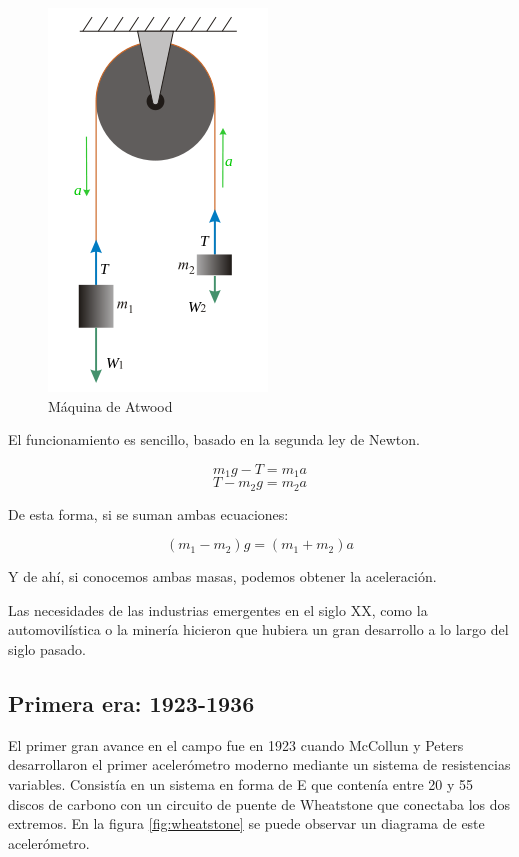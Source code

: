 \documentclass[12pt]{book}
\numberwithin{equation}{section}
\begin{document}
\begin{figure}[h]
    \centering
    \includegraphics[scale=0.5]{atwood.png}
    \caption{Máquina de Atwood}
    \label{fig:atwood}
\end{figure}

El funcionamiento es sencillo, basado en la segunda ley de Newton.

\begin{equation}
m_1 g -T = m_1 a
\end{equation}
\begin{equation}
T - m_2 g = m_2 a
\end{equation}

De esta forma, si se suman ambas ecuaciones:

\begin{equation}
(m_1 -m_2)g = (m_1+m_2)a
\end{equation}

Y de ahí, si conocemos ambas masas, podemos obtener la aceleración.

Las necesidades de las industrias emergentes en el siglo XX, como la automovilística o la minería hicieron que hubiera un gran desarrollo a lo largo del siglo pasado.

\subsection{Primera era: 1923-1936}

El primer gran avance en el campo fue en 1923 cuando McCollun y Peters\cite{6534032} desarrollaron el primer acelerómetro moderno mediante un sistema de resistencias variables. Consistía en un sistema en forma de E que contenía entre 20 y 55 discos de carbono con un circuito de puente de Wheatstone que conectaba los dos extremos. En la figura \ref{fig:wheatstone} se puede observar un diagrama de este acelerómetro.
\end{document}
